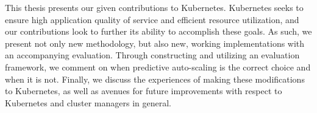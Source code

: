 This thesis presents our given contributions to Kubernetes. Kubernetes seeks to
ensure high application quality of service and efficient resource utilization,
and our contributions look to further its ability to accomplish these
goals. As such, we present not only new methodology, but also new, working
implementations with an accompanying evaluation. Through constructing and
utilizing an evaluation framework, we comment on when predictive
auto-scaling is the correct choice and when it is not. Finally, we
discuss the experiences of making these modifications to Kubernetes, as well as
avenues for future improvements with respect to Kubernetes and cluster managers in
general.

